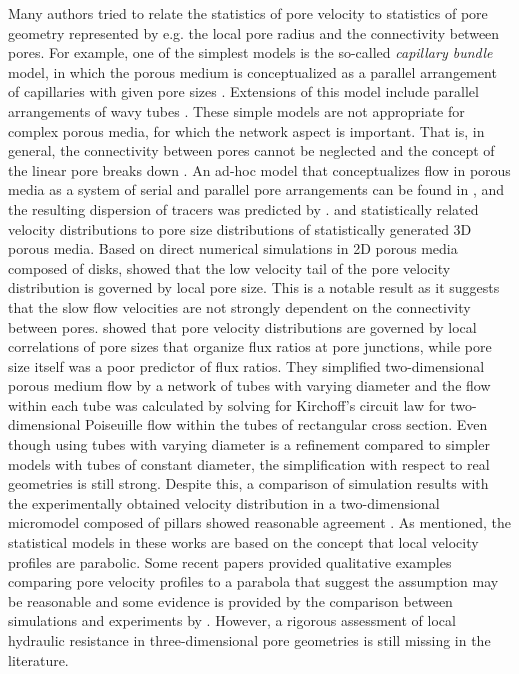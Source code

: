 \documentclass[draft]{agujournal2019}
\begin{document}
Many authors tried to relate the statistics of pore velocity to statistics of pore geometry represented by e.g. the local pore radius and the connectivity between pores. For example, one of the simplest models is the so-called \emph{capillary bundle} model, in which the porous medium is conceptualized as a parallel arrangement of capillaries with given pore sizes \cite{scheidegger_physics_1974}. Extensions of this model include parallel arrangements of wavy tubes \cite{le_borgne_effective_2011}. These simple models are not appropriate for complex porous media, for which the network aspect is important. That is, in general, the connectivity between pores cannot be neglected and the concept of the linear pore breaks down \cite{dentz_mechanisms_2018}. An ad-hoc model that conceptualizes flow in porous media as a system of serial and parallel pore arrangements can be found in , and the resulting dispersion of tracers was predicted by .  and  statistically related velocity distributions to pore size distributions of statistically generated 3D porous media. Based on direct numerical simulations in 2D porous media composed of disks,  showed that the low velocity tail of the pore velocity distribution is governed by local pore size. This is a notable result as it suggests that the slow flow velocities are not strongly dependent on the connectivity between pores.  showed that pore velocity distributions are governed by local correlations of pore sizes that organize flux ratios at pore junctions, while pore size itself was a poor predictor of flux ratios. They simplified two-dimensional porous medium flow by a network of tubes with varying diameter and the flow within each tube was calculated by solving for Kirchoff’s circuit law for two-dimensional Poiseuille flow within the tubes of rectangular cross section. Even though using tubes with varying diameter is a refinement compared to simpler models with tubes of constant diameter, the simplification with respect to real geometries is still strong. Despite this, a comparison of simulation results with the experimentally obtained velocity distribution in a two-dimensional micromodel composed of pillars showed reasonable agreement \cite{alim_local_2017}. As mentioned, the statistical models in these works are based on the concept that local velocity profiles are parabolic. Some recent papers provided qualitative examples comparing pore velocity profiles to a parabola that suggest the assumption may be reasonable \cite{de_anna_prediction_2017,dentz_mechanisms_2018} and some evidence is provided by the comparison between simulations and experiments by . However, a rigorous assessment of local hydraulic resistance in three-dimensional pore geometries is still missing in the literature. 
\end{document}
